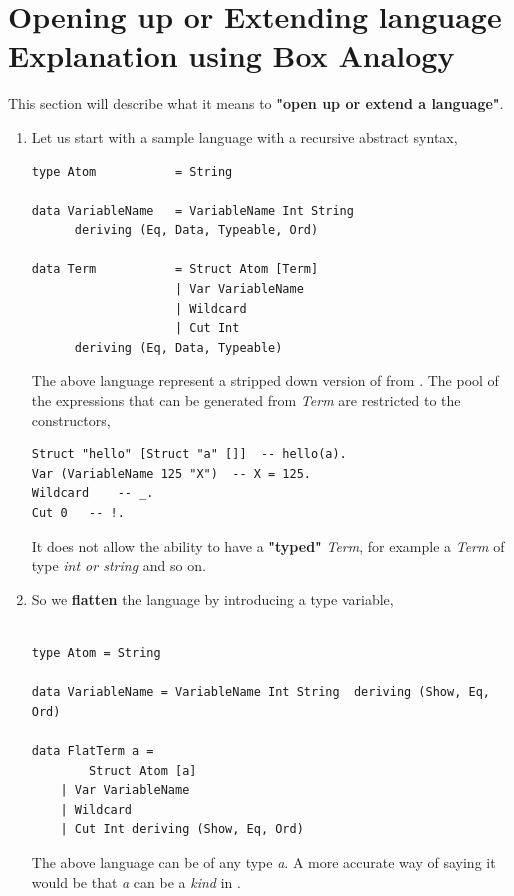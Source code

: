 \documentclass[thesis-solanki.tex]{subfiles}
\begin{document}
\clearpage

\section{Opening up or Extending language Explanation using Box Analogy}

This section will describe what it means to \textbf{"open up or extend a language"}. 

\begin{enumerate}
\item Let us start with a sample language with a recursive abstract syntax,
\begin{verbatim}
type Atom         	= String

data VariableName 	= VariableName Int String
      deriving (Eq, Data, Typeable, Ord)

data Term 			= Struct Atom [Term]
          			| Var VariableName
          			| Wildcard  
          			| Cut Int
      deriving (Eq, Data, Typeable)
\end{verbatim}

The above language represent a stripped down version of  from \cite{prolog-lib}. The pool of the expressions that can
be generated from \textit{Term} are restricted to the constructors,   

\begin{verbatim}
Struct "hello" [Struct "a" []] 	-- hello(a).
Var (VariableName 125 "X")	-- X = 125.
Wildcard	-- _.
Cut 0	-- !.
\end{verbatim}

It does not allow the ability to have a \textbf{"typed"} \textit{Term}, for example a \textit{Term} of type \textit{int or string} and
so on.


\item So we \textbf{flatten} the language by introducing a type variable,

\begin{verbatim}

type Atom = String

data VariableName = VariableName Int String  deriving (Show, Eq, Ord)

data FlatTerm a = 
		Struct Atom [a]
	| Var VariableName
	| Wildcard
	| Cut Int deriving (Show, Eq, Ord)

\end{verbatim}

The above language can be of any type \textit{a}. A more accurate way of saying it would be that \textit{a} can be a \textit{kind} in 
. 


\end{enumerate}
\end{document}
